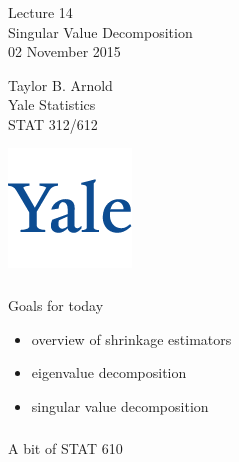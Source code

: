 



\begin{frame}[fragile] \frametitle{}

\vfill

{\fontsize{0.7cm}{0cm}\selectfont Lecture 14 \\\vspace{0.2cm}
Singular Value Decomposition}\\\vspace{0.5cm}
02 November 2015

\vspace{2cm}

\begin{minipage}{0.6\textwidth}
Taylor B. Arnold \\
Yale Statistics \\
STAT 312/612
\end{minipage}
\hfill
\begin{minipage}{0.3\textwidth}\raggedleft
\includegraphics[scale=0.3]{../yale-logo.png}
\end{minipage}%

\end{frame}

\begin{frame}[fragile] \frametitle{}

{\color{yaleblue}\fontsize{16pt}{20pt}\selectfont Goals for today}

\begin{itemize}
\item overview of shrinkage estimators
\item eigenvalue decomposition
\item singular value decomposition
\end{itemize}

\end{frame}

\begin{frame}[fragile] \frametitle{}

\begin{flushright}
{\color{yaleblue}\sc\fontsize{1cm}{0cm}\selectfont A bit of STAT 610}
\end{flushright}

\end{frame}


